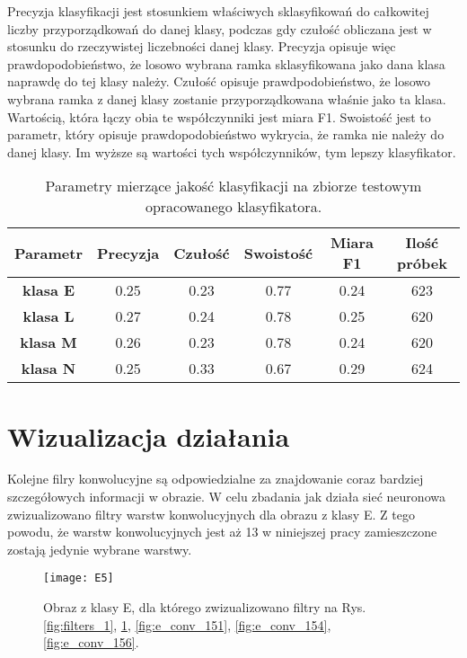 {Precyzja klasyfikacji jest stosunkiem właściwych sklasyfikowań do całkowitej liczby przyporządkowań do danej klasy, podczas gdy czułość obliczana jest w stosunku do rzeczywistej liczebności danej klasy. Precyzja opisuje więc prawdopodobieństwo, że losowo wybrana ramka sklasyfikowana jako dana klasa naprawdę do tej klasy należy. Czułość opisuje prawdpodobieństwo, że losowo wybrana ramka z danej klasy zostanie przyporządkowana właśnie jako ta klasa. Wartością, która łączy obia te współczynniki jest miara F1. Swoistość jest to parametr, który opisuje prawdopodobieństwo wykrycia, że ramka nie należy do danej klasy. Im wyższe są wartości tych współczynników, tym lepszy klasyfikator.

\begin{table}[h!]
\centering
\caption[Short Heading]{Parametry mierzące jakość klasyfikacji na zbiorze testowym opracowanego klasyfikatora.}
\label{tab:params_test}
\begin{tabular}{|c|c|c|c|c|c|}
\hline
\textbf{Parametr}                               & \textbf{Precyzja} & \textbf{Czułość} & \textbf{Swoistość} & \textbf{Miara F1} & \textbf{Ilość próbek}\\ \hline
\textbf{klasa E} & 0.25   & 0.23   & 0.77 & 0.24 & 623 \\ \hline
\textbf{klasa L} & 0.27  & 0.24 & 0.78 & 0.25 & 620 \\ \hline
\textbf{klasa M} & 0.26   & 0.23    & 0.78 & 0.24  & 620 \\ \hline
\textbf{klasa N} & 0.25   & 0.33   & 0.67 & 0.29 & 624  \\ \hline
\end{tabular}
\end{table}
}

\section{Wizualizacja działania}

Kolejne filry konwolucyjne są odpowiedzialne za znajdowanie coraz bardziej szczegółowych informacji w obrazie. W celu zbadania jak działa sieć neuronowa zwizualizowano filtry warstw konwolucyjnych dla obrazu z klasy E. Z tego powodu, że warstw konwolucyjnych jest aż 13 w niniejszej pracy zamieszczone zostają jedynie wybrane warstwy.

\begin{figure}[h!]
	\centering
	\centering
		\texttt{[image: E5]}	
	\caption{Obraz z klasy E, dla którego zwizualizowano filtry na Rys. \ref{fig:filters_1}, \ref{fig:e_conv_148},   \ref{fig:e_conv_151},  \ref{fig:e_conv_154},  \ref{fig:e_conv_156}.}\label{fig:e_conv_148}
\end{figure}

